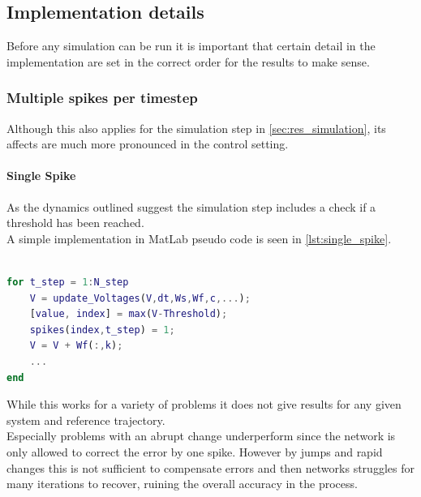 \subsection{Implementation details}
Before any simulation can be run it is important that certain detail in the implementation are set in the correct order for the results to make sense.


\subsubsection{Multiple spikes per timestep}
Although this also applies for the simulation step in \cref{sec:res_simulation}, its affects are much more pronounced in the control setting.\\
\paragraph{Single Spike}
As the dynamics outlined suggest the simulation step includes a check if a threshold has been reached. \\
A simple implementation in MatLab pseudo code is seen in \cref{lst:single_spike}.

\begin{lstlisting}[language=Matlab, caption=Single spike implementation,label=lst:single_spike]

for t_step = 1:N_step
	V = update_Voltages(V,dt,Ws,Wf,c,...);
	[value, index] = max(V-Threshold);
	spikes(index,t_step) = 1;
	V = V + Wf(:,k);
	...
end
\end{lstlisting}
While this works for a variety of problems it does not give results for any given system and reference trajectory.\\
Especially problems with an abrupt change underperform since the network is only allowed to correct the error by one spike. However by jumps and rapid changes this is not sufficient to compensate errors and then networks struggles for many iterations to recover, ruining the overall accuracy in the process.\\
